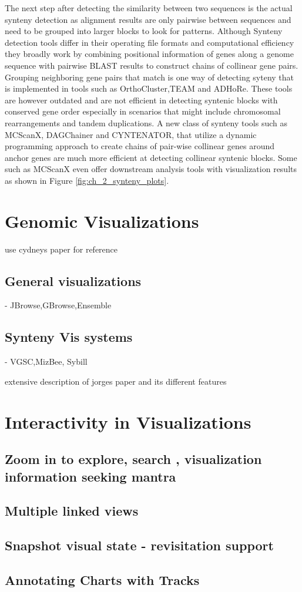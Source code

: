 The next step after detecting the similarity between two sequences is the actual synteny detection as alignment results are only pairwise between sequences and need to be grouped into larger blocks to look for patterns. Although Synteny detection tools differ in their operating file formats and computational efficiency they broadly work by combining positional information of genes along a genome sequence with pairwise BLAST results to construct chains of collinear gene pairs. Grouping neighboring gene pairs that match is one way of detecting syteny\cite{wang2012mcscanx} that is implemented in tools such as OrthoCluster\cite{zeng2008orthocluster},TEAM\cite{luc2003gene} and ADHoRe\cite{proost2011adhore}. These tools are however outdated and are not efficient in detecting syntenic blocks with conserved gene order especially in scenarios that might include chromosomal rearrangements and tandem duplications\cite{wang2012mcscanx}. A new class of synteny tools such as MCScanX\cite{wang2012mcscanx}, DAGChainer\cite{haas2004dagchainer} and CYNTENATOR\cite{rodelsperger2010cyntenator}, that utilize a dynamic programming approach to create chains of pair-wise collinear genes around anchor genes are much more efficient at detecting collinear syntenic blocks. Some such as MCScanX even offer downstream analysis tools with visualization results as shown in Figure \ref{fig:ch_2_synteny_plots}.     






\section{Genomic Visualizations} 

use cydneys paper for reference
\subsection{General visualizations} - JBrowse,GBrowse,Ensemble
\subsection{Synteny Vis systems} - VGSC,MizBee, Sybill

extensive description of jorges paper and its different features

\section{Interactivity in Visualizations}
\subsection{Zoom in to explore, search , visualization information seeking mantra}
\subsection{Multiple linked views}
\subsection{Snapshot visual state - revisitation support}
\subsection{Annotating Charts with Tracks}


